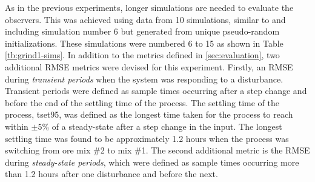 As in the previous experiments, longer simulations are needed to evaluate the observers. This was achieved using data from 10 simulations, similar to and including simulation number 6 but generated from unique pseudo-random initializations. These simulations were numbered 6 to 15 as shown in Table \ref{tb:grind1-sims}. In addition to the metrics defined in \ref{sec:evaluation}, two additional \gls{RMSE} metrics were devised for this experiment. Firstly, an \gls{RMSE} during \textit{transient periods} when the system was responding to a disturbance. Transient periods were defined as sample times occurring after a step change and before the end of the settling time of the process. The settling time of the process, \gls{tset95}, was defined as the longest time taken for the process to reach within $\pm5\%$ of a steady-state after a step change in the input. The longest settling time was found to be approximately 1.2 hours when the process was switching from ore mix \#2 to mix \#1. The second additional metric is the \gls{RMSE} during \textit{steady-state periods}, which were defined as sample times occurring more than 1.2 hours after one disturbance and before the next. 

